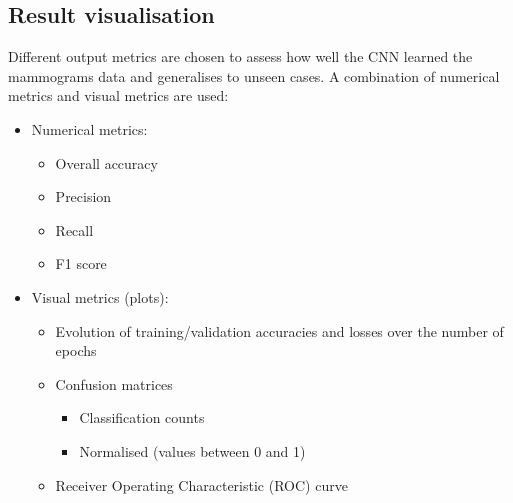 
\subsection{Result visualisation}
\label{sec:design-results-visualisation}

Different output metrics are chosen to assess how well the CNN learned the mammograms data and generalises to unseen cases. A combination of numerical metrics and visual metrics are used:

\begin{itemize}
    \item Numerical metrics:
    \begin{itemize}
        \item Overall accuracy
        \item Precision
        \item Recall
        \item F1 score
    \end{itemize}
    \item Visual metrics (plots):
    \begin{itemize}
        \item Evolution of training/validation accuracies and losses over the number of epochs
        \item Confusion matrices
        \begin{itemize}
            \item Classification counts
            \item Normalised (values between 0 and 1)
        \end{itemize}
        \item Receiver Operating Characteristic (ROC) curve
    \end{itemize}
\end{itemize}
